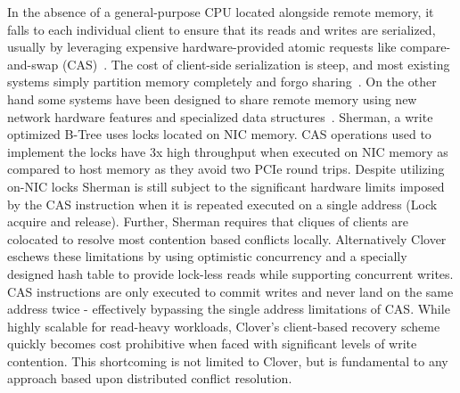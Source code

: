 In the absence of a general-purpose CPU located alongside remote memory, it
falls to each individual client to ensure that its reads and writes are
serialized, usually by leveraging expensive hardware-provided atomic requests
like compare-and-swap (CAS)~\cite{design-guidelines}. The cost of client-side
serialization is steep, and most existing systems simply partition memory
completely and forgo sharing~\cite{reigons,fastswap, legoos}.  
On the other hand some systems have been designed to share remote memory using
new network hardware features and specialized data
structures~\cite{clover,sherman}. Sherman, a write optimized B-Tree uses locks
located on NIC memory. CAS operations used to implement the locks have 3x high
throughput when executed on NIC memory as compared to host memory as they avoid
two PCIe round trips.
Despite utilizing on-NIC locks Sherman is still subject to the significant
hardware limits imposed by the CAS instruction when it is repeated executed on a
single address (Lock acquire and release). Further, Sherman requires that
cliques of clients are colocated to resolve most contention based conflicts
locally.
Alternatively Clover~\cite{clover} eschews these limitations by using optimistic
concurrency and a specially designed hash table to provide lock-less reads while
supporting concurrent writes. CAS instructions are only executed to commit
writes and never land on the same address twice - effectively bypassing the
single address limitations of CAS.
While highly scalable for read-heavy workloads, Clover's client-based recovery
scheme quickly becomes cost prohibitive when faced with significant levels of
write contention.  This shortcoming is not limited to Clover, but is fundamental
to any approach based upon distributed conflict resolution.


